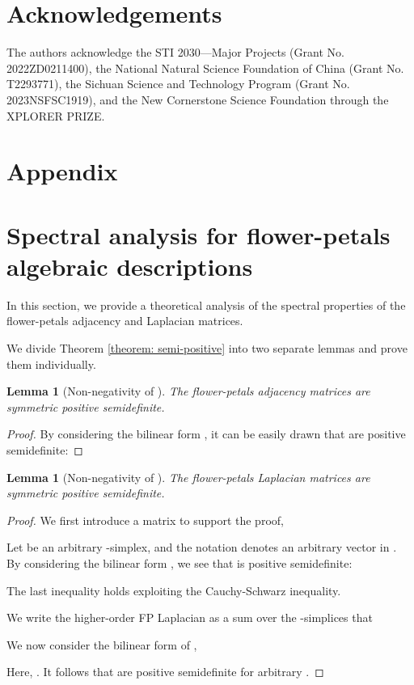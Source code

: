 \documentclass[letterpaper]{article} \usepackage{aaai24}
\theoremstyle{plain}
\newtheorem{lemma}[theorem]{Lemma}
\theoremstyle{definition}
\theoremstyle{remark}
\begin{document}
\section*{Acknowledgements}
The authors acknowledge the STI 2030—Major Projects (Grant No. 2022ZD0211400), the National Natural Science Foundation of China (Grant No. T2293771), the Sichuan Science and Technology Program (Grant No. 2023NSFSC1919), and the New Cornerstone Science Foundation through the XPLORER PRIZE.


\appendix



\clearpage
\section*{\centering \Large Appendix}

\section{Spectral analysis for flower-petals algebraic descriptions}
\label{appendix: spectral}
In this section, we provide a theoretical analysis of the spectral properties of the flower-petals adjacency and Laplacian matrices.


We divide Theorem \ref{theorem: semi-positive} into two separate lemmas and prove them individually.

\begin{lemma}[Non-negativity of ]
\label{lemma: semi-positive_A}
The flower-petals adjacency matrices  are symmetric positive semidefinite.
\end{lemma}

\begin{proof}
By considering the bilinear form , it can be easily drawn that  are positive semidefinite:

\end{proof}

\begin{lemma}[Non-negativity of ]
\label{lemma: semi-positive_L}
The flower-petals Laplacian matrices  are symmetric positive semidefinite.
\end{lemma}

\begin{proof}
We first introduce a matrix  to support the proof,


Let  be an arbitrary -simplex, and the notation  denotes an arbitrary vector in . By considering the bilinear form , we see that  is positive semidefinite:

The last inequality holds exploiting the Cauchy-Schwarz inequality.

We write the higher-order FP Laplacian as a sum over the -simplices that


We now consider the bilinear form of ,

Here, . It follows that  are positive semidefinite for arbitrary .
\end{proof}
\end{document}
